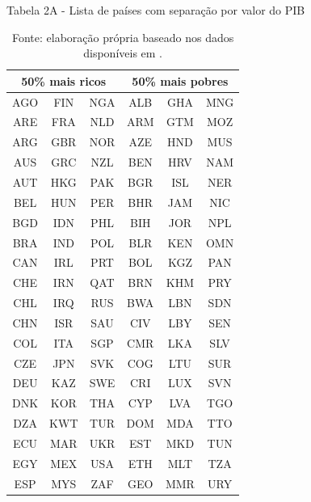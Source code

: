 \begin{table}[H]
\centering

\caption*{Tabela 2A - Lista de países com separação por valor do PIB}
\label{tab:paises}
\begin{tabular}{@{}cccccc@{}}
\multicolumn{3}{c}{50\% mais ricos} & \multicolumn{3}{c}{50\% mais pobres} \\ \midrule
AGO & FIN & NGA & ALB & GHA & MNG \\
ARE & FRA & NLD & ARM & GTM & MOZ \\
ARG & GBR & NOR & AZE & HND & MUS \\
AUS & GRC & NZL & BEN & HRV & NAM \\
AUT & HKG & PAK & BGR & ISL & NER \\
BEL & HUN & PER & BHR & JAM & NIC \\
BGD & IDN & PHL & BIH & JOR & NPL \\
BRA & IND & POL & BLR & KEN & OMN \\
CAN & IRL & PRT & BOL & KGZ & PAN \\
CHE & IRN & QAT & BRN & KHM & PRY \\
CHL & IRQ & RUS & BWA & LBN & SDN \\
CHN & ISR & SAU & CIV & LBY & SEN \\
COL & ITA & SGP & CMR & LKA & SLV \\
CZE & JPN & SVK & COG & LTU & SUR \\
DEU & KAZ & SWE & CRI & LUX & SVN \\
DNK & KOR & THA & CYP & LVA & TGO \\
DZA & KWT & TUR & DOM & MDA & TTO \\
ECU & MAR & UKR & EST & MKD & TUN \\
EGY & MEX & USA & ETH & MLT & TZA \\
ESP & MYS & ZAF & GEO & MMR & URY \\ \bottomrule
\end{tabular}%
\caption*{\RaggedRight  Fonte: elaboração própria baseado nos dados disponíveis em \cite{WorldBank2019}.}
\end{table}



